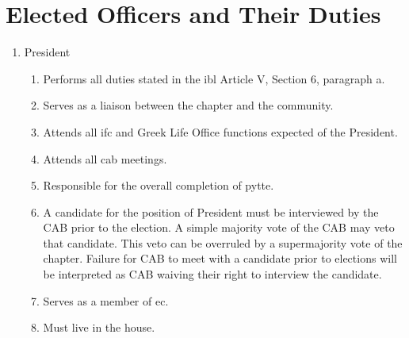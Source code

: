 \section{Elected Officers and Their Duties}
	\begin{enumerate}
		\item President
			\begin{enumerate}
				\item Performs all duties stated in the \gls{ibl} Article V, Section 6, paragraph a.
				\item Serves as a liaison between the chapter and the community.
				\item Attends all \gls{ifc} and Greek Life Office functions expected of the President.
				\item Attends all \gls{cab} meetings.
				\item Responsible for the overall completion of \gls{pytte}.
                \item A candidate for the position of President must be interviewed by the CAB prior to the
election. A simple majority vote of the CAB may veto that candidate. This veto can be overruled
by a supermajority vote of the chapter. Failure for CAB to meet with a candidate prior to
elections will be interpreted as CAB waiving their right to interview the candidate.
				\item Serves as a member of \gls{ec}.
				\item Must live in the house.
			\end{enumerate}


\end{enumerate}
